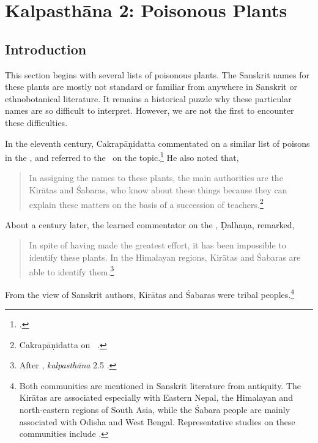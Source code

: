 \newcommand{\plant}[4]{#1 (\emph{#2})\footnoteA{#3; see #4}}
\let\chemical = \plant
\newcommand{\skt}[2]{#1 (\emph{#2})}
\newcommand{\sskt}[2]{\empty}
%

\chapter{Kalpasthāna 2: Poisonous Plants}

\section{Introduction}

This section begins with several lists of poisonous plants.  The
Sanskrit names for these plants are mostly not standard or familiar
from anywhere in Sanskrit or ethnobotanical literature.  It remains a
historical puzzle why these particular names are so difficult to
interpret. However, we are not the first to encounter these
difficulties. 

In the eleventh century, Cakrapāṇidatta commentated on 
a similar list of poisons in the \CS, and referred to the \SS\ on the 
topic.\footnote{.}   He 
also noted that,
\begin{quote}
    In assigning the names to these plants, the main authorities are
the Kirātas and Śabaras, who know about these things because they
can explain these matters on the basis of a succession of
teachers.\footnote{Cakrapāṇidatta on \CS\ .}
\end{quote}
\par
\noindent
About a century later, the learned commentator on the \SS, Ḍalhaṇa, 
remarked,
\begin{quote}
    \label{kiratas}
In spite of having made the greatest effort, it has been impossible to
identify these plants. In the Himalayan regions, Kirātas and Śabaras
are able to identify them.\footnote{After \SS, \emph{kalpasthāna} 2.5
    \citep[564]{vulgate}.}
\end{quote}
From the view of Sanskrit authors, Kirātas and Śabaras were tribal
peoples.\footnote{Both communities are mentioned in Sanskrit
    literature from antiquity.  The Kirātas are associated especially with
    Eastern Nepal, the Himalayan and north-eastern regions of South Asia,
    while the Śabara people are mainly associated with Odisha and West
    Bengal.  Representative studies on these communities include
    \citet{chat-1951,sing-2008,roy-1970,elwi-1955,subb-1999,rai-2019a,sing-1990}.}
     
